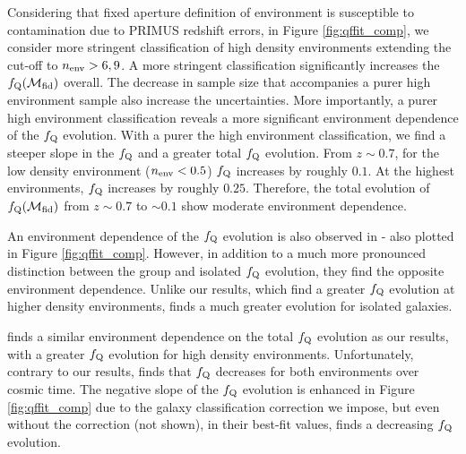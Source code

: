\documentclass{emulateapj}
\begin{document}
Considering that fixed aperture definition of environment is susceptible to contamination due to PRIMUS redshift errors, in Figure \ref{fig:qffit_comp}, we consider more stringent classification of high density environments extending the cut-off to $n_{\rm{env}} > 6, 9$. A more stringent classification significantly increases the $f_{\rm{Q}}(\mathcal{M}_{\rm{fid}})$ overall. The decrease in sample size that accompanies a purer high environment sample also increase the uncertainties. More importantly, a purer high environment classification reveals a more significant environment dependence of the $f_{\rm{Q}}$ evolution. With a purer the high environment classification, we find a steeper slope in the $f_{\rm{Q}}$ and a greater total $f_{\rm{Q}}$ evolution. From $ z \sim 0.7$, for the low density environment ($n_{\rm{env}} < 0.5$) $f_{\rm{Q}}$ increases by roughly $0.1$. At the highest environments, $f_{\rm{Q}}$ increases by roughly $0.25$. Therefore, the total evolution of $f_{\rm{Q}}(\mathcal{M}_{\rm{fid}})$ from $z \sim 0.7$ to $\sim 0.1$ show moderate environment dependence.

An environment dependence of the $f_{\rm{Q}}$ evolution is also observed in \cite{Iovino:2010aa} - also plotted in Figure \ref{fig:qffit_comp}. However, in addition to a much more pronounced distinction between the group and isolated $f_{\rm{Q}}$ evolution, they find the opposite environment dependence. Unlike our results, which find a greater $f_{\rm{Q}}$ evolution at higher density environments, \cite{Iovino:2010aa} finds a much greater evolution for isolated galaxies. 

\cite{Kovac:2014aa} finds a similar environment dependence on the total $f_{\rm{Q}}$ evolution as our results, with a greater $f_{\rm{Q}}$ evolution for high density environments. Unfortunately, contrary to our results, \cite{Kovac:2014aa} finds that $f_{\rm{Q}}$ decreases for both environments over cosmic time. The negative slope of the $f_{\rm{Q}}$ evolution is enhanced in Figure \ref{fig:qffit_comp} due to the galaxy classification correction we impose, but even without the correction (not shown), in their best-fit values, \cite{Kovac:2014aa} finds a decreasing $f_{\rm{Q}}$ evolution. 
\end{document}
